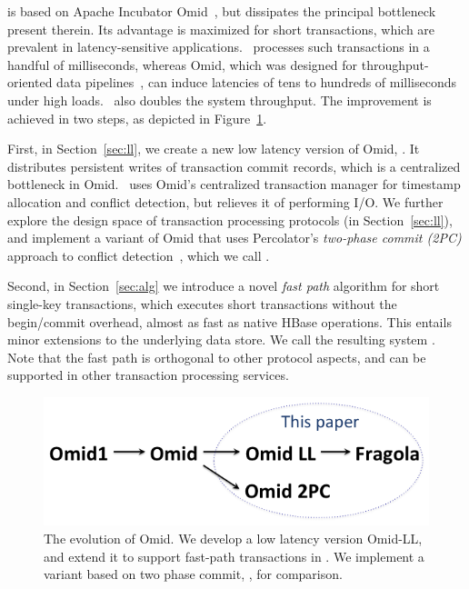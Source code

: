 {\sys\/} is based on Apache Incubator Omid~\cite{omid}, but dissipates the principal bottleneck present therein.
Its advantage is maximized for short  transactions, which are prevalent in latency-sensitive applications.
\sys\ processes  such transactions in a handful of milliseconds, whereas Omid, 
which was designed for throughput-oriented data pipelines~\cite{Omid2017}, 
can induce latencies of tens to hundreds of milliseconds under high loads. 
\sys\ also doubles the system throughput.
The  improvement  is achieved in two steps, as depicted in Figure~\ref{fig:evolution}.  

First, in Section~\ref{sec:ll}, we create a new low latency version of Omid, \sysll. It  
distributes persistent writes of transaction commit records, which is a centralized bottleneck in Omid. 
\sysll\ uses Omid's centralized transaction manager for timestamp allocation and conflict detection, 
but relieves it of performing I/O. We further explore the design space of transaction processing protocols (in Section~\ref{sec:ll}), 
and implement a variant of Omid that uses Percolator's \emph{two-phase commit (2PC)} approach to 
conflict detection~\cite{Percolator2010}, which we call \syspc. 
  
Second, in Section~\ref{sec:alg} we introduce a novel \emph{fast path} algorithm for short single-key transactions, which 
executes short transactions without the begin/commit overhead, 
 almost as fast as native HBase operations. This entails minor extensions to the underlying 
data store. We call the resulting system \sys. Note that
the fast path is orthogonal to other protocol aspects, and can be supported in other 
transaction processing services. 

\begin{figure}
  \centerline{
        \includegraphics[width=0.75\columnwidth]{figs/OmidEvolutionFlat}	
  }
\caption{The evolution of Omid. We develop a low latency version Omid-LL, and extend it to support fast-path transactions in \sys.
              We implement a variant based on two phase commit, \syspc, for comparison.}
\label{fig:evolution}
\end{figure}


